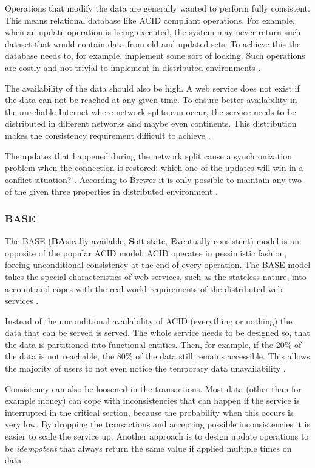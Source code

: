 \documentclass{tktltiki}
\begin{document}
Operations that modify the data are generally wanted to perform fully consistent.  This means relational database like ACID compliant operations.  For example, when an update operation is being executed, the system may never return such dataset that would contain data from old and updated sets.  To achieve this the database needs to, for example, implement some sort of locking.  Such operations are costly and not trivial to implement in distributed environments \cite{GiL02}.

The availability of the data should also be high.  A web service does not exist if the data can not be reached at any given time.  To ensure better availability in the unreliable Internet where network splits can occur, the service needs to be distributed in different networks and maybe even continents.  This distribution makes the consistency requirement difficult to achieve \cite{GiL02}.

The updates that happened during the network split cause a synchronization problem when the connection is restored: which one of the updates will win in a conflict situation? \cite{GiL02}.  According to Brewer it is only possible to maintain any two of the given three properties in distributed environment \cite{Bre02}.


\subsubsection{BASE}

The BASE (\textbf{BA}sically available, \textbf{S}oft state, \textbf{E}ventually consistent) model is an opposite of the popular ACID model.  ACID operates in pessimistic fashion, forcing unconditional consistency at the end of every operation.  The BASE model takes the special characteristics of web services, such as the stateless nature, into account and copes with the real world requirements of the distributed web services \cite{Pri08}.

Instead of the unconditional availability of ACID (everything or nothing) the data that can be served is served.  The whole service needs to be designed so, that the data is partitioned into functional entities.  Then, for example, if the 20\% of the data is not reachable, the 80\% of the data still remains accessible.  This allows the majority of users to not even notice the temporary data unavailability \cite{Pri08}.

Consistency can also be loosened in the transactions.  Most data (other than for example money) can cope with inconsistencies that can happen if the service is interrupted in the critical section, because the probability when this occurs is very low.  By dropping the transactions and accepting possible inconsistencies it is easier to scale the service up.  Another approach is to design update operations to be \emph{idempotent} that always return the same value if applied multiple times on data \cite{Pri08}.
\end{document}
